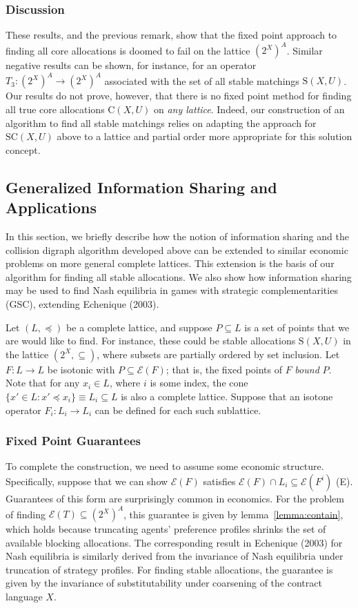 \documentclass[11pt,reqno]{amsart}
\theoremstyle{definition}
\numberwithin{equation}{section}
\newcommand{\prealloc}{(2^X)^A}
\newcommand{\sub}{\subseteq}
\newcommand{\strcore}{\mathrm{SC}(X,U)}
\newcommand{\core}{\mathrm{C}(X,U)}
\newcommand{\stable}{\mathrm{S}(X,U)}
\newcommand{\fix}{\mathcal{E}}
\newcommand{\peq}{\preceq}
\newcommand{\opthree}{T_3}
\newcommand{\oper}{F}
\newcommand{\point}{P}
\newcommand{\lattice}{L}
\begin{document}
\subsubsection{Discussion} 
These results, and the previous remark, show that the fixed point approach to finding all core allocations is doomed to fail on the lattice $\prealloc$.
Similar negative results can be shown, for instance, for an operator $\opthree: \prealloc \to \prealloc$ associated with the set of all stable matchings $\stable$.
Our results do not prove, however, that there is no fixed point method for finding all true core allocations $\core$ on \emph{any lattice}.
Indeed, our construction of an algorithm to find all stable matchings relies on adapting the approach for $\strcore$ above to a lattice and partial order more appropriate for this solution concept. 

\subsection{Generalized Information Sharing and Applications} \label{section:general}
In this section, we briefly describe how the notion of information sharing and the collision digraph algorithm developed above can be extended to similar economic problems on more general complete lattices.
This extension is the basis of our algorithm for finding all stable allocations. 
We also show how information sharing may be used to find Nash equilibria in games with strategic complementarities (GSC), extending Echenique (2003).

Let $(\lattice,\peq)$ be a complete lattice, and suppose $\point \sub \lattice$ is a set of points that we are would like to find. 
For instance, these could be stable allocations $\stable$ in the lattice $(2^X,\sub)$, where subsets are partially ordered by set inclusion. 
Let $\oper: \lattice \to \lattice$ be isotonic with $\point \sub \fix(\oper)$; that is, the fixed points of $\oper$ \emph{bound} $\point$.
Note that for any $x_i \in \lattice$, where $i$ is some index, the cone $\{x' \in \lattice: x' \peq x_i\} \equiv \lattice_i \sub L$ is also a complete lattice.
Suppose that an isotone operator $F_i : \lattice_i \to \lattice_i$ can be defined for each such sublattice.

\subsubsection{Fixed Point Guarantees} 
To complete the construction, we need to assume some economic structure. 
Specifically, suppose that we can show $\fix(\oper)$ satisfies $\fix(\oper) \cap \lattice_i \sub \fix(\oper^i)$ (E).
Guarantees of this form are surprisingly common in economics.
For the problem of finding $\fix(T) \sub \prealloc$, this guarantee is given by lemma~\ref{lemma:contain}, which holds because truncating agents' preference profiles shrinks the set of available blocking allocations.
The corresponding result in Echenique (2003) for Nash equilibria is similarly derived from the invariance of Nash equilibria under truncation of strategy profiles.
For finding stable allocations, the guarantee is given by the invariance of substitutability under coarsening of the contract language $X$.
\end{document}
